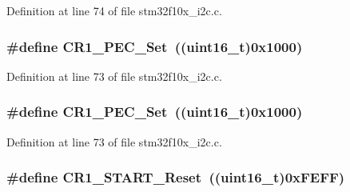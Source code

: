 Definition at line 74 of file stm32f10x\+\_\+i2c.\+c.

\subsubsection[{\texorpdfstring{C\+R1\+\_\+\+P\+E\+C\+\_\+\+Set}{CR1_PEC_Set}}]{\setlength{\rightskip}{0pt plus 5cm}\#define C\+R1\+\_\+\+P\+E\+C\+\_\+\+Set~(({\bf uint16\+\_\+t})0x1000)}\hypertarget{group___i2_c___private___defines_gad0ab853d291338d4cf3aee736353f0b8}{}\label{group___i2_c___private___defines_gad0ab853d291338d4cf3aee736353f0b8}


Definition at line 73 of file stm32f10x\+\_\+i2c.\+c.

\subsubsection[{\texorpdfstring{C\+R1\+\_\+\+P\+E\+C\+\_\+\+Set}{CR1_PEC_Set}}]{\setlength{\rightskip}{0pt plus 5cm}\#define C\+R1\+\_\+\+P\+E\+C\+\_\+\+Set~(({\bf uint16\+\_\+t})0x1000)}\hypertarget{group___i2_c___private___defines_gad0ab853d291338d4cf3aee736353f0b8}{}\label{group___i2_c___private___defines_gad0ab853d291338d4cf3aee736353f0b8}


Definition at line 73 of file stm32f10x\+\_\+i2c.\+c.

\subsubsection[{\texorpdfstring{C\+R1\+\_\+\+S\+T\+A\+R\+T\+\_\+\+Reset}{CR1_START_Reset}}]{\setlength{\rightskip}{0pt plus 5cm}\#define C\+R1\+\_\+\+S\+T\+A\+R\+T\+\_\+\+Reset~(({\bf uint16\+\_\+t})0x\+F\+E\+F\+F)}\hypertarget{group___i2_c___private___defines_gacc62242e31a380aec2ef9f836b3cf19d}{}\label{group___i2_c___private___defines_gacc62242e31a380aec2ef9f836b3cf19d}


